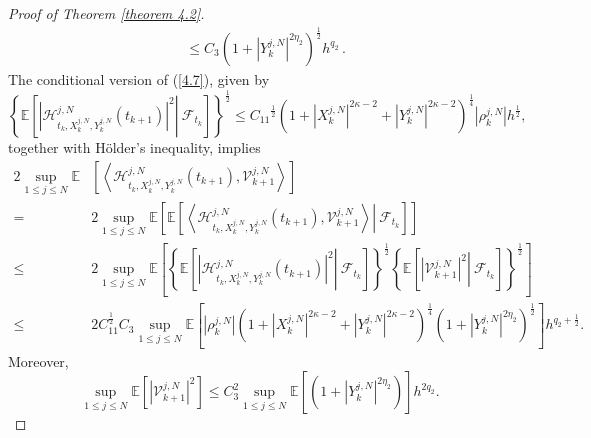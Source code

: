 \documentclass[12pt]{article}
\numberwithin{equation}{section}
\begin{document}
\begin{proof}[ Proof of Theorem \ref{theorem 4.2}]
\begin{equation}
\begin{aligned}
&\leq C_3 \left( 1+\left| Y_{k}^{j,N} \right|^{2\eta _2}  \right) ^{\frac{1}{2}}h^{q_2}\,. 
\end{aligned}
\end{equation}
The conditional version of (\ref{4.7}), given by 
 \begin{equation}\tag{5.44}\label{4.31}
\left\{ \mathbb{E} \left[\left. \left| \mathcal{H} _{t_k,X_{k}^{j,N},Y_{k}^{j,N}}^{j,N}\left(t_{k+1}\right) \right|^2\right\rvert\ \mathcal{F} _{t_k} \right] \right\} ^{\frac{1}{2}}\le {C_{11}}^{\frac{1}{2}} \left( 1+\left|X_{k}^{j,N}\right|^{2\kappa -2}+\left|Y_{k}^{j,N}\right|^{2\kappa -2} \right) ^{\frac{1}{4}}\left|\rho^{j,N} _k\right|  h^{\frac{1}{2}},
\end{equation}
together with H\"{o}lder's inequality, implies 
\begin{equation}\tag{5.45}\label{4.32}
\begin{aligned}
 2 \underset{1\leqslant j\leqslant N} {\sup}\mathbb{E}&\left[\left\langle\mathcal{H}^{j,N}_{t_k, X^{j,N}_k, Y^{j,N}_k}\left(t_{k+1}\right), \mathcal{V}^{j,N}_{k+1}\right\rangle\right] \\
= & 2  \underset{1\leqslant j\leqslant N}{\sup}\mathbb{E}\left[\mathbb{E}\left[\left.\left\langle\mathcal{H}^{j,N}_{t_k, X^{j,N}_k, Y^{j,N}_k}\left(t_{k+1}\right), \mathcal{V}^{j,N}_{k+1}\right\rangle \right\rvert\ \mathcal{F}_{t_k}\right]\right] \\
\leq & 2 \underset{1\leqslant j\leqslant N}{\sup} \mathbb{E}\left[\left\{\mathbb{E}\left[\left.\left|\mathcal{H}^{j,N}_{t_k, X^{j,N}_k, Y^{j,N}_k}\left(t_{k+1}\right)\right|^{2} \right\rvert\ \mathcal{F}_{t_k}\right]\right\}^{\frac{1}{2}}\left\{\mathbb{E}\left[\left.\left|\mathcal{V}^{j,N}_{k+1}\right|^{2} \right\rvert\ \mathcal{F}_{t_k}\right]\right\}^{\frac{1}{2}}\right] \\
\leq & 2C^{\frac{1}{2}}_{11}C_3\underset{1\leqslant j\leqslant N}{\sup}\mathbb{E}\left[\left|\rho^{j,N}_k\right|\left(1+\left|X^{j,N}_k\right|^{2 \kappa-2}+\left|Y^{j,N}_k\right|^{2 \kappa-2}\right)^{\frac{1}{4}}\left(1+\left|Y^{j,N}_k\right|^{2\eta_2}\right)^{\frac{1}{2}}\right] h^{q_2+\frac{1}{2}}.
\end{aligned}
\end{equation}
Moreover,
\begin{equation}\tag{5.46}\label{4.33}
\underset{1\leqslant j\leqslant N}{\sup}\mathbb{E} \left[\left |\mathcal{V}^{j,N}_{k+1}\right|^2 \right] \le C^2_{3}\underset{1\leqslant j\leqslant N}{\sup}\mathbb{E} \left[ \left( 1+\left| Y_{k}^{j,N} \right|^{2\eta _2} \right) \right] h^{2q_2}.

\end{equation}
\end{proof}
\end{document}
